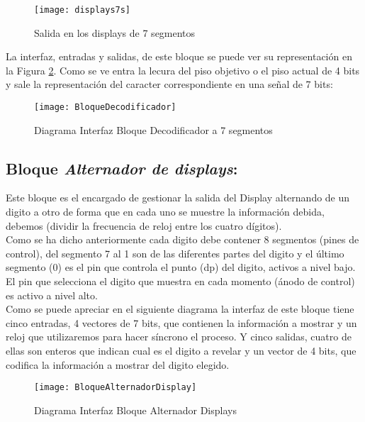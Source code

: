     \begin{figure}[H]
		    \centering
		    \texttt{[image: displays7s]}
		    \caption{Salida en los displays de 7 segmentos}
		    \label{fig:displays7s}
	\end{figure}
    
    La interfaz, entradas y salidas, de este bloque se puede ver su representación en la Figura \ref{fig:BloqueDecodificador7seg}. Como se ve entra la lecura del piso objetivo o el piso actual de 4 bits y sale la representación del caracter correspondiente en una señal de 7 bits:
    
    \begin{figure}[H]
		    \centering
		    \texttt{[image: BloqueDecodificador]}
		    \caption{Diagrama Interfaz Bloque Decodificador a 7 segmentos}
		    \label{fig:BloqueDecodificador7seg}
	\end{figure}
\subsection{Bloque \textit{Alternador de displays}:} \label{bloque:AlternadorDisplay}
    Este bloque es el encargado de gestionar la salida del Display alternando de un digito a otro de forma que en cada uno se muestre la información debida, debemos (dividir la frecuencia de reloj entre los cuatro dígitos). \\
    
	Como se ha dicho anteriormente cada digito debe contener 8 segmentos (pines de control), del segmento 7 al 1 son de las diferentes partes del digito y el último segmento (0) es el pin que controla el punto (dp) del digito, activos a nivel bajo. El pin que selecciona el digito que muestra en cada momento (ánodo de control) es activo a nivel alto. \\
	
	Como se puede apreciar en el siguiente diagrama la interfaz de este bloque tiene cinco entradas, 4 vectores de 7 bits, que contienen la información a mostrar  y un reloj que utilizaremos para hacer síncrono el proceso. Y cinco salidas, cuatro de ellas son enteros que indican cual es el digito a revelar y un vector de 4 bits, que codifica la información a mostrar del digito elegido.

	\begin{figure}[H]
		    \centering
		    \texttt{[image: BloqueAlternadorDisplay]}
		    \caption{Diagrama Interfaz Bloque Alternador Displays}
		    \label{fig:BloqueAlternadorDisplay}
	\end{figure}

